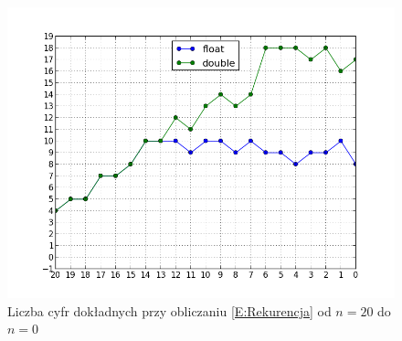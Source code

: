 \documentclass[11pt,leqno]{article}
\begin{document}
\begin{center}
    \begin{figure}[!h]
        \vspace{-2em}
        \begin{center}
        \includegraphics[scale=0.5,angle=0]{wykresbleduwstecz.png}
        \vspace{-2,5em}
        \caption{Liczba cyfr dokładnych przy obliczaniu \eqref{E:Rekurencja} od $n=20$ do $n=0$}\label{G:WykresBleduWstecz}
    \end{center}
    \vspace{-2em}
    \end{figure}
\end{center}
\end{document}
